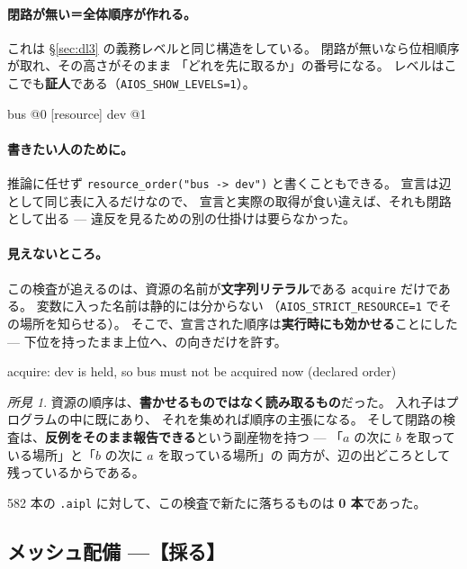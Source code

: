 \documentclass[11pt,a4paper]{ltjsarticle}
\theoremstyle{definition}
\theoremstyle{remark}
\newtheorem{finding}[theorem]{所見}
\begin{document}
\paragraph{閉路が無い＝全体順序が作れる。}
これは \S\ref{sec:dl3} の義務レベルと同じ構造をしている。
閉路が無いなら位相順序が取れ、その高さがそのまま
「どれを先に取るか」の番号になる。
レベルはここでも\textbf{証人}である（\texttt{AIOS\_SHOW\_LEVELS=1}）。

\begin{term}
[resource] bus                  @0
[resource] dev                  @1
\end{term}

\paragraph{書きたい人のために。}
推論に任せず \texttt{resource\_order("bus -> dev")} と書くこともできる。
宣言は辺として同じ表に入るだけなので、
宣言と実際の取得が食い違えば、それも閉路として出る ---
違反を見るための別の仕掛けは要らなかった。

\paragraph{見えないところ。}
この検査が追えるのは、資源の名前が\textbf{文字列リテラル}である
\texttt{acquire} だけである。
変数に入った名前は静的には分からない
（\texttt{AIOS\_STRICT\_RESOURCE=1} でその場所を知らせる）。
そこで、宣言された順序は\textbf{実行時にも効かせる}ことにした ---
下位を持ったまま上位へ、の向きだけを許す。

\begin{term}
acquire: dev is held, so bus must not be acquired now (declared order)
\end{term}

\begin{finding}
資源の順序は、\textbf{書かせるものではなく読み取るもの}だった。
入れ子はプログラムの中に既にあり、
それを集めれば順序の主張になる。
そして閉路の検査は、\textbf{反例をそのまま報告できる}という副産物を持つ ---
「$a$ の次に $b$ を取っている場所」と「$b$ の次に $a$ を取っている場所」の
両方が、辺の出どころとして残っているからである。

582 本の \texttt{.aipl} に対して、この検査で新たに落ちるものは
\textbf{0 本}であった。
\end{finding}

\subsection{メッシュ配備 ---【採る】}
\label{sec:mesh}
\end{document}
